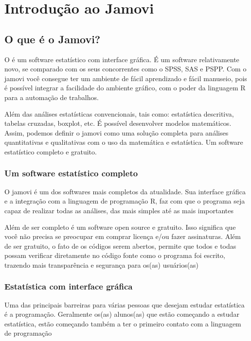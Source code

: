 \chapter{Introdução ao Jamovi}

\section{O que é o Jamovi?}

O \textcite{Jamovi2022} é um software estatístico com interface gráfica. É um software relativamente novo, se comparado com os seus concorrentes como o SPSS, SAS e PSPP. Com o jamovi você consegue ter um ambiente de fácil aprendizado e fácil manuseio, pois é possível integrar a facilidade do ambiente gráfico, com o poder da linguagem R para a automação de trabalhos.

Além das análises estatísticas convencionais, tais como: estatística descritiva, tabelas cruzadas, boxplot, etc. É possível desenvolver modelos matemáticos. Assim, podemos definir o jamovi como uma solução completa para análises quantitativas e qualitativas com o uso da matemática e estatística. Um software estatístico completo e gratuito.

\subsection{Um software estatístico completo}

O jamovi é um dos softwares mais completos da atualidade. Sua interface gráfica e a integração com a linguagem de programação R, faz com que o programa seja capaz de realizar todas as análises, das mais simples até as mais importantes

Além de ser completo é um software open source e gratuito. Isso significa que você não precisa se preocupar em comprar licença e/ou fazer assinaturas. Além de ser gratuito, o fato de os códigos serem abertos, permite que todos e todas possam verificar diretamente no código fonte como o programa foi escrito, trazendo mais transparência e segurança para os(as) usuários(as)

\subsection{Estatística com interface gráfica}

Uma das principais barreiras para várias pessoas que desejam estudar estatística é a programação. Geralmente os(as) alunos(as) que estão começando a estudar estatística, estão começando também a ter o primeiro contato com a linguagem de programação

